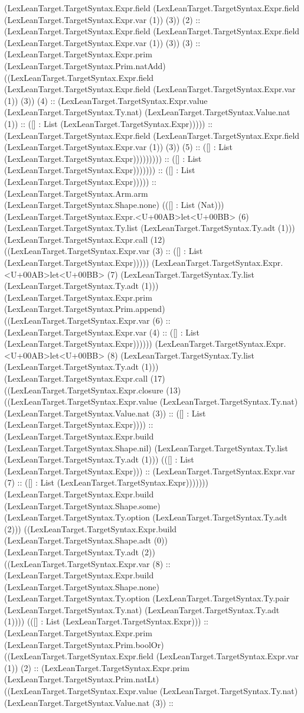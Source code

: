 \documentclass[11pt]{article}
\begin{document}
(LexLeanTarget.TargetSyntax.Expr.field (LexLeanTarget.TargetSyntax.Expr.field (LexLeanTarget.TargetSyntax.Expr.var (1)) (3)) (2) :: (LexLeanTarget.TargetSyntax.Expr.field (LexLeanTarget.TargetSyntax.Expr.field (LexLeanTarget.TargetSyntax.Expr.var (1)) (3)) (3) :: (LexLeanTarget.TargetSyntax.Expr.prim (LexLeanTarget.TargetSyntax.Prim.natAdd) ((LexLeanTarget.TargetSyntax.Expr.field (LexLeanTarget.TargetSyntax.Expr.field (LexLeanTarget.TargetSyntax.Expr.var (1)) (3)) (4) :: (LexLeanTarget.TargetSyntax.Expr.value (LexLeanTarget.TargetSyntax.Ty.nat) (LexLeanTarget.TargetSyntax.Value.nat (1)) :: ([] : List (LexLeanTarget.TargetSyntax.Expr))))) :: (LexLeanTarget.TargetSyntax.Expr.field (LexLeanTarget.TargetSyntax.Expr.field (LexLeanTarget.TargetSyntax.Expr.var (1)) (3)) (5) :: ([] : List (LexLeanTarget.TargetSyntax.Expr))))))))) :: ([] : List (LexLeanTarget.TargetSyntax.Expr))))))) :: ([] : List (LexLeanTarget.TargetSyntax.Expr))))) :: (LexLeanTarget.TargetSyntax.Arm.arm (LexLeanTarget.TargetSyntax.Shape.none) (([] : List (Nat))) (LexLeanTarget.TargetSyntax.Expr.<U+00AB>let<U+00BB> (6) (LexLeanTarget.TargetSyntax.Ty.list (LexLeanTarget.TargetSyntax.Ty.adt (1))) (LexLeanTarget.TargetSyntax.Expr.call (12) ((LexLeanTarget.TargetSyntax.Expr.var (3) :: ([] : List (LexLeanTarget.TargetSyntax.Expr))))) (LexLeanTarget.TargetSyntax.Expr.<U+00AB>let<U+00BB> (7) (LexLeanTarget.TargetSyntax.Ty.list (LexLeanTarget.TargetSyntax.Ty.adt (1))) (LexLeanTarget.TargetSyntax.Expr.prim (LexLeanTarget.TargetSyntax.Prim.append) ((LexLeanTarget.TargetSyntax.Expr.var (6) :: (LexLeanTarget.TargetSyntax.Expr.var (4) :: ([] : List (LexLeanTarget.TargetSyntax.Expr)))))) (LexLeanTarget.TargetSyntax.Expr.<U+00AB>let<U+00BB> (8) (LexLeanTarget.TargetSyntax.Ty.list (LexLeanTarget.TargetSyntax.Ty.adt (1))) (LexLeanTarget.TargetSyntax.Expr.call (17) ((LexLeanTarget.TargetSyntax.Expr.closure (13) ((LexLeanTarget.TargetSyntax.Expr.value (LexLeanTarget.TargetSyntax.Ty.nat) (LexLeanTarget.TargetSyntax.Value.nat (3)) :: ([] : List (LexLeanTarget.TargetSyntax.Expr)))) :: (LexLeanTarget.TargetSyntax.Expr.build (LexLeanTarget.TargetSyntax.Shape.nil) (LexLeanTarget.TargetSyntax.Ty.list (LexLeanTarget.TargetSyntax.Ty.adt (1))) (([] : List (LexLeanTarget.TargetSyntax.Expr))) :: (LexLeanTarget.TargetSyntax.Expr.var (7) :: ([] : List (LexLeanTarget.TargetSyntax.Expr))))))) (LexLeanTarget.TargetSyntax.Expr.build (LexLeanTarget.TargetSyntax.Shape.some) (LexLeanTarget.TargetSyntax.Ty.option (LexLeanTarget.TargetSyntax.Ty.adt (2))) ((LexLeanTarget.TargetSyntax.Expr.build (LexLeanTarget.TargetSyntax.Shape.adt (0)) (LexLeanTarget.TargetSyntax.Ty.adt (2)) ((LexLeanTarget.TargetSyntax.Expr.var (8) :: (LexLeanTarget.TargetSyntax.Expr.build (LexLeanTarget.TargetSyntax.Shape.none) (LexLeanTarget.TargetSyntax.Ty.option (LexLeanTarget.TargetSyntax.Ty.pair (LexLeanTarget.TargetSyntax.Ty.nat) (LexLeanTarget.TargetSyntax.Ty.adt (1)))) (([] : List (LexLeanTarget.TargetSyntax.Expr))) :: (LexLeanTarget.TargetSyntax.Expr.prim (LexLeanTarget.TargetSyntax.Prim.boolOr) ((LexLeanTarget.TargetSyntax.Expr.field (LexLeanTarget.TargetSyntax.Expr.var (1)) (2) :: (LexLeanTarget.TargetSyntax.Expr.prim (LexLeanTarget.TargetSyntax.Prim.natLt) ((LexLeanTarget.TargetSyntax.Expr.value (LexLeanTarget.TargetSyntax.Ty.nat) (LexLeanTarget.TargetSyntax.Value.nat (3)) :: 
\end{document}
